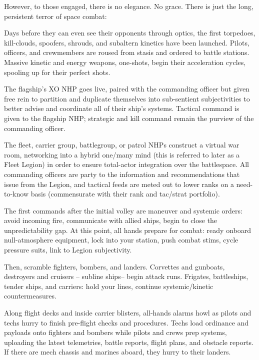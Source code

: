                                                                                                            


However, to those engaged, there is no elegance. No grace. There is just the long, persistent  
terror of space combat:
 

Days before they can even see their opponents through optics, the first torpedoes, kill-clouds,  
spoofers, shrouds, and subaltern kinetics have been launched. Pilots, officers, and  
crewmembers are roused from stasis and ordered to battle stations. Massive kinetic and energy  
weapons, one-shots, begin their acceleration cycles, spooling up for their perfect shots. 
 

The flagship’s XO NHP goes live, paired with the commanding officer but given free rein to  
partition and duplicate themselves into sub-sentient subjectivities to better advise and  
coordinate all of their ship’s systems. Tactical command is given to the flagship NHP; strategic  
and kill command remain the purview of the commanding officer. 
 

The fleet, carrier group, battlegroup, or patrol NHPs construct a virtual war room, networking into  
a hybrid one/many mind (this is referred to later as a Fleet Legion) in order to ensure total-actor  
integration over the battlespace. All commanding officers are party to the information and  
recommendations that issue from the Legion, and tactical feeds are meted out to lower ranks on  
a need-to-know basis (commensurate with their rank and tac/strat portfolio).
 

The first commands after the initial volley are maneuver and systemic orders: avoid incoming fire,  
communicate with allied ships, begin to close the unpredictability gap. At this point, all hands  
prepare for combat: ready onboard null-atmosphere equipment, lock into your station, push  
combat stims, cycle pressure suits, link to Legion subjectivity.
 

Then, scramble fighters, bombers, and landers. Corvettes and gunboats, destroyers and cruisers  
-- subline ships-- begin attack runs. Frigates, battleships, tender ships, and carriers: hold your  
lines, continue systemic/kinetic countermeasures.   
 

Along flight decks and inside carrier blisters, all-hands alarms howl as pilots and techs hurry to  
finish pre-flight checks and procedures. Techs load ordinance and payloads onto fighters and  
bombers while pilots and crews prep systems, uploading the latest telemetries, battle reports,  
flight plans, and obstacle reports. If there are mech chassis and marines aboard, they hurry to  
their landers. 
 

